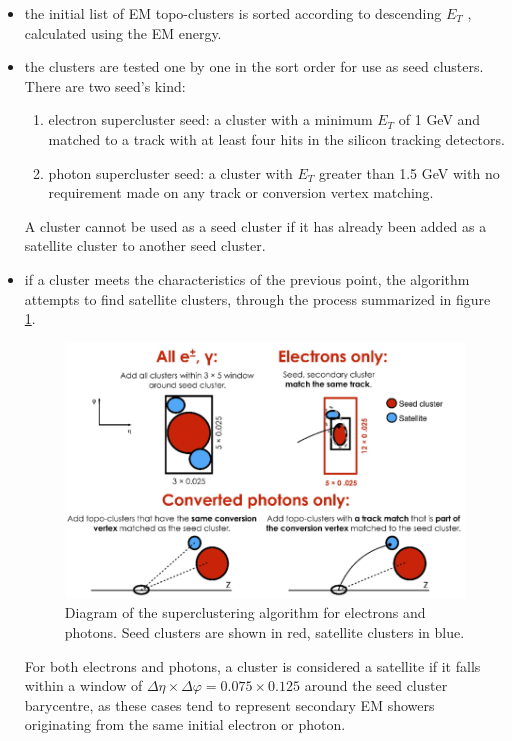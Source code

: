 \documentclass[a4paper, oneside, 11pt, openright]{book}
\begin{document}
		\begin{itemize}
		\item the initial list of EM topo-clusters is
		sorted according to descending $E_T$ , calculated using the EM energy.
		\item the clusters are tested one by one in the sort order for use as seed clusters. There are two seed's kind:
			\begin{enumerate}[label=\roman*.]
				\item electron supercluster seed: a cluster with a minimum $E_T$ of 1 GeV and matched to a track with at least four hits in the silicon tracking detectors.
				\item photon supercluster seed: a cluster with $E_T$ greater
				than 1.5 GeV with no requirement made on any track or conversion
				vertex matching.
			\end{enumerate}
		A cluster cannot be used as a seed cluster if it has already been added as a satellite cluster to another seed cluster.
		\item if a cluster meets the characteristics of the previous point, the algorithm attempts to find satellite clusters, through the process summarized in figure \ref{fig:super_cl}.
		\begin{figure}
			\centering
			\includegraphics[width=0.6\textheight]{tesi_images/super_cluster.png}
			\caption{Diagram of the superclustering algorithm for electrons and photons. Seed clusters are shown in
			red, satellite clusters in blue.}
			\label{fig:super_cl}
		\end{figure}
		For both electrons and photons, a cluster is considered a satellite if it falls within a window of $\Delta\eta \times \Delta\varphi = 0.075 \times 0.125$ around the seed cluster barycentre, as these cases tend to represent secondary EM showers originating from the same initial electron or photon.

\end{itemize}
\end{document}
